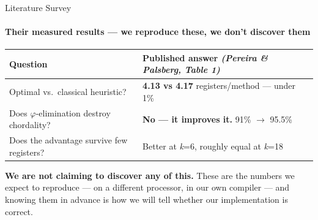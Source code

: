 \documentclass[aspectratio=169,11pt]{beamer}
\begin{document}
\begin{frame}{Literature Survey}
\framesubtitle{Their measured results --- we reproduce these, we don't discover them}
\vspace{2mm}
\centering
{\footnotesize
\begin{tabular}{@{}p{5.4cm}p{7.4cm}@{}}
\toprule
Question & Published answer \emph{(Pereira \& Palsberg, Table 1)} \\
\midrule
Optimal vs.\ classical heuristic?          & \textbf{4.13 vs 4.17} registers/method --- under 1\% \\
Does $\varphi$-elimination destroy chordality? & \textbf{No --- it improves it.} 91\% $\rightarrow$ 95.5\% \\
Does the advantage survive few registers?  & Better at \emph{k}=6, roughly equal at \emph{k}=18 \\
\bottomrule
\end{tabular}}
\vspace{5mm}

\begin{minipage}{0.86\textwidth}\small
\textbf{We are not claiming to discover any of this.} These are the numbers we
expect to reproduce --- on a different processor, in our own compiler --- and
knowing them in advance is how we will tell whether our implementation is
correct.
\end{minipage}
\end{frame}
\end{document}
